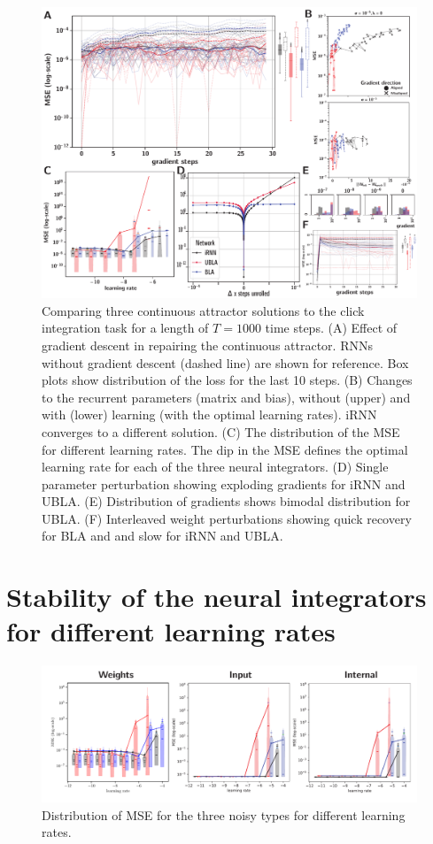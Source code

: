 \documentclass{article} %
\newcounter{ct}
\theoremstyle{definition}
\theoremstyle{remark}
\begin{document}
\begin{figure}[thbp]
  \centering
  \includegraphics[width=\textwidth]{maintenance_T1000.pdf}
  \caption{
  Comparing three continuous attractor solutions to the click integration task for a length of $T=1000$ time steps.
  (A) Effect of gradient descent in repairing the continuous attractor. RNNs without gradient descent (dashed line) are shown for reference. Box plots show distribution of the loss for the last 10 steps.
  (B) Changes to the recurrent parameters (matrix and bias), without (upper) and with (lower) learning (with the optimal learning rates). iRNN converges to a different solution.
 (C)  The distribution of the MSE for different learning rates. The dip in the MSE defines the optimal learning rate for each of the three neural integrators. 
    (D) Single parameter perturbation showing exploding gradients for iRNN and UBLA.
  (E) Distribution of gradients shows bimodal distribution for UBLA.
    (F) Interleaved weight perturbations showing quick recovery for BLA and and slow for iRNN and UBLA.
  }
  \label{fig:maintenance:long}
\end{figure}

\newpage
\section{Stability of the neural integrators for different learning rates}

\begin{figure}[thbp]
     \centering
    \includegraphics[width=\textwidth]{all_lrs_vs_mses_f1}
       \caption{Distribution of MSE for the three noisy types for different learning rates.}
         \label{fig:all_lrs_vs_mses}
\end{figure}
\end{document}
